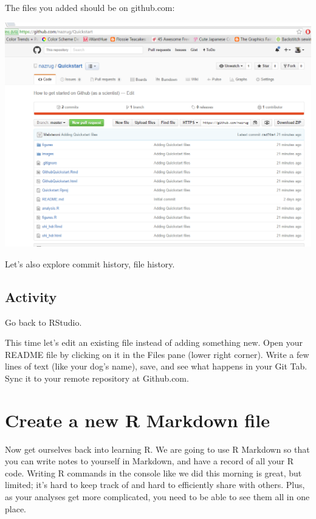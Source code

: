 \documentclass[]{book}
\begin{document}
The files you added should be on github.com:

\includegraphics{img/Github_remote.png}

Let's also explore commit history, file history.

\hypertarget{activity-1}{%
\subsection{Activity}\label{activity-1}}

Go back to RStudio.

This time let's edit an existing file instead of adding something new. Open your README file by clicking on it in the Files pane (lower right corner). Write a few lines of text (like your dog's name), save, and see what happens in your Git Tab. Sync it to your remote repository at Github.com.

\hypertarget{create-a-new-r-markdown-file}{%
\section{Create a new R Markdown file}\label{create-a-new-r-markdown-file}}

Now get ourselves back into learning R. We are going to use R Markdown so that you can write notes to yourself in Markdown, and have a record of all your R code. Writing R commands in the console like we did this morning is great, but limited; it's hard to keep track of and hard to efficiently share with others. Plus, as your analyses get more complicated, you need to be able to see them all in one place.
\end{document}
